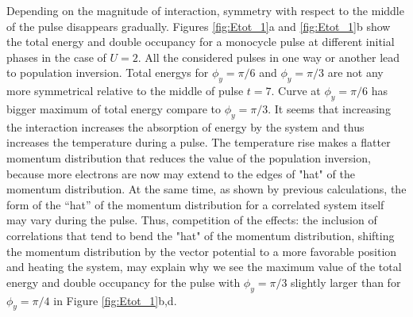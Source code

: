 Depending on the magnitude of interaction, symmetry with respect to the middle of the pulse disappears gradually. Figures \ref{fig:Etot_1}a and \ref{fig:Etot_1}b show the total energy and double occupancy for a monocycle pulse at different initial phases in the case of $U=2$. All the considered pulses in one way or another lead to population inversion. Total energys for $\phi_y=\pi /6$ and $\phi_y=\pi /3$ are not any more symmetrical relative to the middle of pulse $t=7$. Curve at $\phi_y=\pi /6$ has bigger maximum of total energy compare to $\phi_y=\pi /3$. It seems that increasing the interaction increases the absorption of energy by the system and thus increases the temperature during a pulse. The temperature rise makes a flatter momentum distribution that reduces the value of the population inversion, because more electrons are now may extend to the edges of "hat" of the momentum distribution. At the same time, as shown by previous calculations, the form of the “hat” of the momentum distribution for a correlated system itself may vary during the pulse. Thus, competition of the effects: the inclusion of correlations that tend to bend the "hat" of the momentum distribution, shifting the momentum distribution by the vector potential to a more favorable position and heating the system, may explain why we see the maximum value of the total energy and double occupancy for the pulse with $\phi_y=\pi /3$ slightly larger than for $\phi_y=\pi /4$ in Figure \ref{fig:Etot_1}b,d.



 


\clearpage

